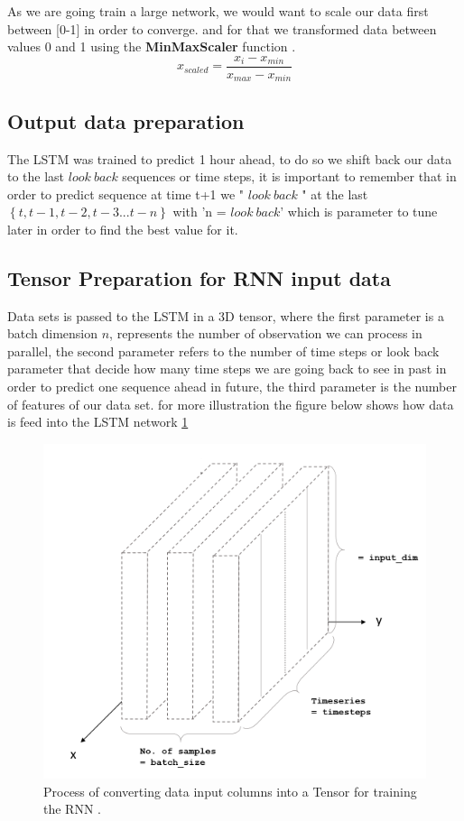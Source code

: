 As we are going train a large network, we would want to scale our data first between [0-1] in order to converge. and for that we transformed data between values 0 and 1 \cite{Chatterjee2017} using the \textbf{MinMaxScaler} function \cite{scikit2011}.
%
\begin{equation}
\label{eq:MaxMin}
x_{scaled} = \frac{x_{i} - x_{min}}{x_{max} - x_{min}}
\end{equation}
%

\subsection{Output data preparation}
The LSTM was trained to predict 1 hour ahead, to do so we shift back our data to the last $look\ back$ sequences or time steps, it is important to remember that in order to predict sequence at time t+1 we " $look\ back$ "  at the last \in$ \left\{t,t-1,t-2,t-3...t-n\right\}$ with 'n = $look\ back$'  which is parameter to tune later in order to find the best value for it.


\subsection{Tensor Preparation for RNN input data}
Data sets is passed to the LSTM in a 3D tensor, where the first parameter is a batch dimension $n$, represents the number of observation we can process in parallel, the second parameter refers to the number of time steps or look back parameter that decide how many time steps we are going back to see in past in order to predict one sequence ahead in future, the third parameter is the number of features of our data set. for more illustration the figure below shows how data is feed into the LSTM network \ref{fig:tensor-tables} 
  
%
\begin{figure}[H]
\centering
\includegraphics[scale=.45]{img/tensor.PNG}  
\caption{Process of converting data input columns into a Tensor for training the RNN \cite{tensor}.}
\label{fig:tensor-tables}
\end{figure}
%

